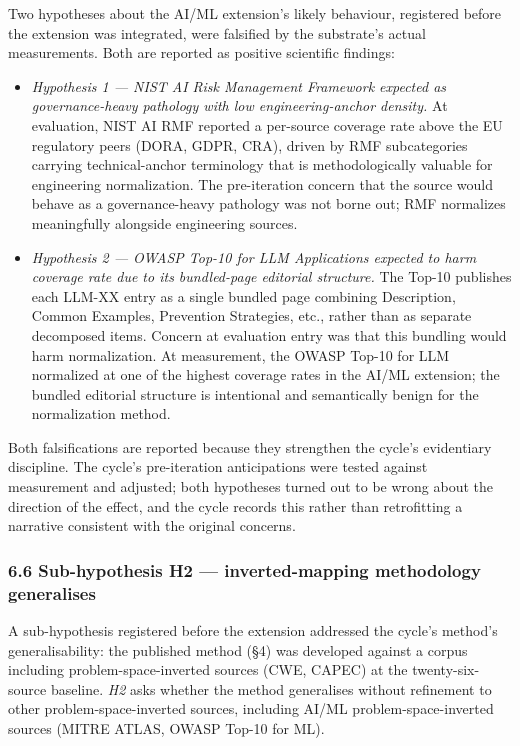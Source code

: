 \documentclass[
]{article}
\providecommand{\tightlist}{%
  \setlength{\itemsep}{0pt}\setlength{\parskip}{0pt}}
\begin{document}
Two hypotheses about the AI/ML extension's likely behaviour, registered
before the extension was integrated, were falsified by the substrate's
actual measurements. Both are reported as positive scientific findings:

\begin{itemize}
\tightlist
\item
  \emph{Hypothesis 1 --- NIST AI Risk Management Framework expected as
  governance-heavy pathology with low engineering-anchor density.} At
  evaluation, NIST AI RMF reported a per-source coverage rate above the
  EU regulatory peers (DORA, GDPR, CRA), driven by RMF subcategories
  carrying technical-anchor terminology that is methodologically
  valuable for engineering normalization. The pre-iteration concern that
  the source would behave as a governance-heavy pathology was not borne
  out; RMF normalizes meaningfully alongside engineering sources.
\item
  \emph{Hypothesis 2 --- OWASP Top-10 for LLM Applications expected to
  harm coverage rate due to its bundled-page editorial structure.} The
  Top-10 publishes each LLM-XX entry as a single bundled page combining
  Description, Common Examples, Prevention Strategies, etc., rather than
  as separate decomposed items. Concern at evaluation entry was that
  this bundling would harm normalization. At measurement, the OWASP
  Top-10 for LLM normalized at one of the highest coverage rates in the
  AI/ML extension; the bundled editorial structure is intentional and
  semantically benign for the normalization method.
\end{itemize}

Both falsifications are reported because they strengthen the cycle's
evidentiary discipline. The cycle's pre-iteration anticipations were
tested against measurement and adjusted; both hypotheses turned out to
be wrong about the direction of the effect, and the cycle records this
rather than retrofitting a narrative consistent with the original
concerns.

\subsubsection{6.6 Sub-hypothesis H2 --- inverted-mapping methodology
generalises}\label{sub-hypothesis-h2-inverted-mapping-methodology-generalises}

A sub-hypothesis registered before the extension addressed the cycle's
method's generalisability: the published method (§4) was developed
against a corpus including problem-space-inverted sources (CWE, CAPEC)
at the twenty-six-source baseline. \emph{H2} asks whether the method
generalises without refinement to other problem-space-inverted sources,
including AI/ML problem-space-inverted sources (MITRE ATLAS, OWASP
Top-10 for ML).
\end{document}

